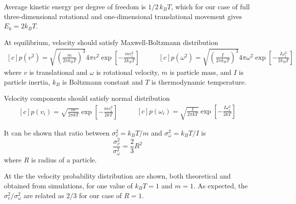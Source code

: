 Average kinetic energy per degree of freedom is $1/2 \, k_B T$, which for our case of full three-dimensional rotational and one-dimensional translational movement gives $E_k = 2 k_B T$.

At equilibrium, velocity should satisfy Maxwell-Boltzmann distribution
\begin{equation}
\label{eq:maxwell_boltzmann_velocity}
	\begin{aligned}[c]
		p(v^2)
			= \sqrt{ \left(\frac{m}{2 \pi k_B T}\right)^3}
			4 \pi v^2 \exp \left[-\frac{mv_i^2}{2k_BT}\right]
	\end{aligned}
	\qquad
	\begin{aligned}[c]
		p(\omega^2)
			= \sqrt{ \left(\frac{I}{2 \pi k_B T}\right)^3}
			4 \pi \omega^2 \exp\left[-\frac{I\omega_i^2}{2 k_B T}\right]
	\end{aligned}
\end{equation}
where $v$ is translational and $\omega$ is rotational velocity, $m$ is particle mass, and $I$ is particle inertia, $k_B$ is Boltzmann constant and $T$ is thermodynamic temperature.

Velocity components should satisfy normal distribution 
\begin{equation}
\label{eq:maxwell_boltzmann_velocity_components}
	\begin{aligned}[c]
		p(v_i)
			= \sqrt{ \frac{m}{2 \pi k T}}
			\exp \left[-\frac{mv_i^2}{2kT}\right]
	\end{aligned}
	\qquad
	\begin{aligned}[c]
		p(\omega_i)
			= \sqrt{ \frac{I}{2 \pi k T}}
			\exp\left[-\frac{I\omega_i^2}{2kT}\right]
	\end{aligned}
\end{equation}

It can be shown that ratio between $\sigma^2_v = k_BT/m$ and $\sigma^2_\omega = k_BT/I$ is
\begin{equation}
\label{eq:velocity_deviation_relation}
	\frac{\sigma^2_v}{\sigma^2_\omega} = \frac{2}{3}R^2
\end{equation}
where $R$ is radius of a particle.

At the  the velocity probability distribution are shown, both theoretical and obtained from simulations, for one value of $k_BT = 1$ and $m = 1$. As expected, the $\sigma^2_v / \sigma^2_\omega$ are related as $2/3$ for our case of $R = 1$.

